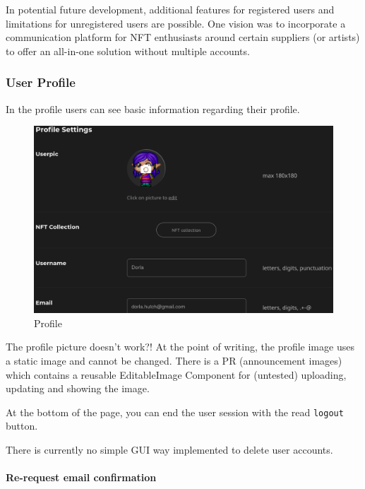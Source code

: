 \documentclass[
]{article}
\begin{document}
In potential future development, additional features for registered
users and limitations for unregistered users are possible. One vision
was to incorporate a communication platform for NFT enthusiasts around
certain suppliers (or artists) to offer an all-in-one solution without
multiple accounts.

\hypertarget{user-profile}{%
\subsubsection{User Profile}\label{user-profile}}

In the profile users can see basic information regarding their profile.

\begin{figure}
\centering
\includegraphics{images/user_profile.png}
\caption{Profile}
\end{figure}\newpage

The profile picture doesn't work?! At the point of writing, the profile
image uses a static image and cannot be changed. There is a PR
(announcement images) which contains a reusable EditableImage Component
for (untested) uploading, updating and showing the image.

At the bottom of the page, you can end the user session with the read
\texttt{logout} button.

There is currently no simple GUI way implemented to delete user
accounts.

\hypertarget{re-request-email-confirmation}{%
\paragraph{Re-request email
confirmation}\label{re-request-email-confirmation}}
\end{document}
